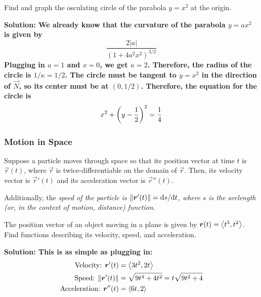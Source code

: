 \begin{example}
    Find and graph the osculating circle of the parabola \(y=x^2\) at the origin.\par\bf{Solution: }We already know that the curvature of the parabola \(y=ax^2\) is given by \[ \frac{2|a|}{(1+4a^2x^2)^{3/2}} \]
    Plugging in \(a=1\) and \(x=0\), we get \(\kappa = 2\). Therefore, the radius of the circle is \(1/\kappa = 1/2\). The circle must be tangent to \(y=x^2\) in the direction of \(\vec N\), so its center must be at \((0, 1/2)\). Therefore, the equation for the circle is
    \[ x^2+\pqty{y-\frac{1}2}^2=\frac{1}{4}\]
\end{example}
\subsubsection{Motion in Space}
Suppose a particle moves through space so that its position vector at time \(t\) is \(\vec r(t)\), where \(\vec r\) is twice-differentiable on the domain of \(\vec r\). Then, its velocity vector is \(\vec r'(t)\) and its acceleration vector is \(\vec r''(t)\). \par Additionally, the \it{speed} of the particle is \(\norm{\boldsymbol{r}'(t)}=\dd s/\dd t\), where \(s\) is the arclength (or, in the context of motion, distance) function.
\begin{example}
    The position vector of an object moving in a plane is given by \(\boldsymbol{r}(t) = \left\langle t^3, t^2\right\rangle\). Find functions describing its velocity, speed, and acceleration.\par\bf{Solution: } This is as simple as plugging in:
    \begin{align*}
        \text{Velocity: } \boldsymbol{r}'(t) &= \left\langle 3t^2, 2t \right\rangle \\
        \text{Speed: } \norm{\boldsymbol{r}'(t)} &= \sqrt{9t^4 + 4t^2} = t\sqrt{9t^2+4} \\
        \text{Acceleration: } \boldsymbol{r}''(t) &= \left\langle 6t, 2\right\rangle
    \end{align*}
\end{example}
